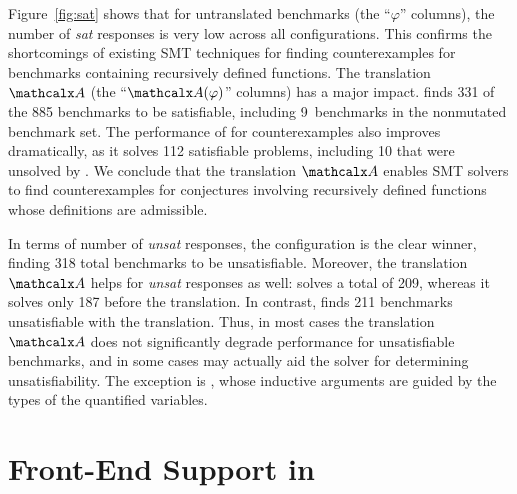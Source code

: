 Figure~\ref{fig:sat} shows that for untranslated benchmarks (the ``$\varphi$''
columns), the number of \emph{sat} responses is very low across all
configurations. This confirms the shortcomings of existing SMT techniques for
finding counterexamples for benchmarks containing recursively defined functions.
%
The translation $\conv$ (the ``$\conv(\varphi)$'' columns) has a major
impact. \cvcf finds 331 of the 885 benchmarks to be satisfiable,
including 9~benchmarks in the nonmutated \leon benchmark set. The
performance of \ziiib for counterexamples also improves dramatically, as it
solves 112 satisfiable problems, including 10 that were unsolved by \cvcf.
%
We conclude that the translation $\conv$ enables SMT
solvers to find counterexamples for conjectures involving recursively defined functions
whose definitions are admissible.

In terms of number of \emph{unsat} responses, the configuration \cvci is the
clear winner, finding 318 total benchmarks to be unsatisfiable. Moreover, the
translation $\conv$ helps \ziii for \emph{unsat} responses as well:
\ziii solves a total of 209, whereas it solves only 187 before the
translation.
%
In contrast, \cvcd finds 211 benchmarks unsatisfiable with the translation.
Thus, in most cases the translation $\conv$ does not significantly degrade performance
for unsatisfiable benchmarks, and in some cases may actually aid the solver for
determining unsatisfiability. The exception is \cvci, whose inductive
arguments are guided by the types of the quantified variables.

\section{Front-End Support in \cvc}
\label{sec:front-end}

